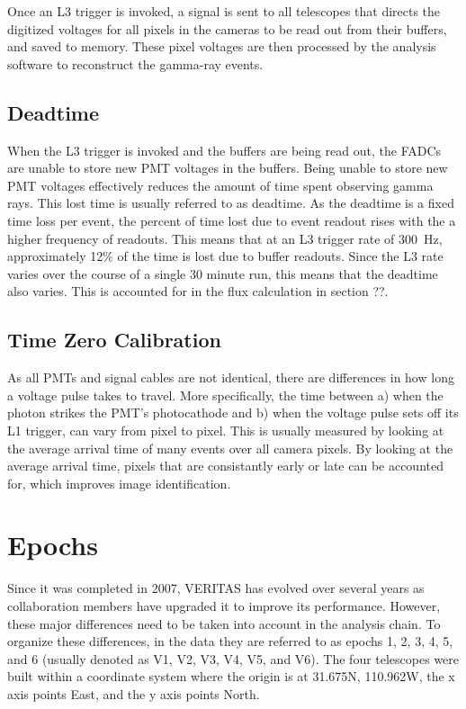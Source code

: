 Once an L3 trigger is invoked, a signal is sent to all telescopes that directs the digitized voltages for all pixels in the cameras to be read out from their buffers, and saved to memory.
These pixel voltages are then processed by the analysis software to reconstruct the gamma-ray events.



\subsection{Deadtime}
When the L3 trigger is invoked and the buffers are being read out, the FADCs are unable to store new PMT voltages in the buffers.
Being unable to store new PMT voltages effectively reduces the amount of time spent observing gamma rays.
This lost time is usually referred to as deadtime.
As the deadtime is a fixed time loss per event, the percent of time lost due to event readout rises with the a higher frequency of readouts.
This means that at an L3 trigger rate of \nicetilde{}\SI{300}{Hz}, approximately \nicetilde{}12\% of the time is lost due to buffer readouts.
Since the L3 rate varies over the course of a single 30 minute run, this means that the deadtime also varies.
This is accounted for in the flux calculation in {\color{red}section ??}.

\subsection{Time Zero Calibration}
As all PMTs and signal cables are not identical, there are differences in how long a voltage pulse takes to travel.
More specifically, the time between a) when the photon strikes the PMT's photocathode and b) when the voltage pulse sets off its L1 trigger, can vary from pixel to pixel.
This is usually measured by looking at the average arrival time of many events over all camera pixels.
By looking at the average arrival time, pixels that are consistantly early or late can be accounted for, which improves image identification.

\section{Epochs}\label{sec:epochs}
Since it was completed in 2007, VERITAS has evolved over several years as collaboration members have upgraded it to improve its performance.
However, these major differences need to be taken into account in the analysis chain.
To organize these differences, in the data they are referred to as epochs 1, 2, 3, 4, 5, and 6 (usually denoted as V1, V2, V3, V4, V5, and V6).
The four telescopes were built within a coordinate system where the origin is at 31.675N, 110.962W, the x axis points East, and the y axis points North.

